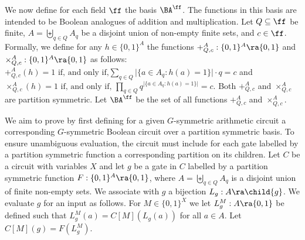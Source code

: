 \documentclass{toc}
\begin{document}
We now define for each field $\ff$ the basis $\BA^{\ff}$. The functions in this
basis are intended to be Boolean analogues of addition and multiplication. Let
$Q \subseteq \ff$ be finite, $A = \biguplus_{q \in Q}A_q$ be a disjoint union of
non-empty finite sets, and $c \in \ff$.  Formally, we define for any $h \in \{0,1\}^{A}$ the functions $+^A_{Q, c}: \{0,
1\}^A \ra \{0, 1\}$ and $\times^A_{Q, c}: \{0, 1\}^A \ra \{0, 1\}$ as follows: $ +^{A}_{Q, c}(h) = 1
\text{ if, and only if,} \sum_{q \in Q} \vert \{a \in A_q : h(a) = 1\} \vert
\cdot q = c $ and $ \times^{A}_{Q, c}(h) = 1 \text{ if, and only if, } \prod_{q
  \in Q} q^{\vert \{a \in A_q : h(a) = 1\} \vert} = c$. Both $+^A_{Q, c}$ and
$\times^A_{Q, c}$ are partition symmetric. Let $\BA^{\ff}$ be the set of all
functions $+^A_{Q, c}$ and $\times^A_{Q, c}$.

We aim to prove  by first defining for a
given $G$-symmetric arithmetic circuit a corresponding $G$-symmetric Boolean
circuit over a partition symmetric basis. To ensure unambiguous evaluation, the
circuit must include for each gate labelled by a partition symmetric function a
corresponding partition on its children. Let $C$ be a circuit with variables $X$
and let $g$ be a gate in $C$ labelled by a partition symmetric function $F :
\{0, 1\}^A \ra \{0, 1\}$, where $A = \biguplus_{q \in Q}A_q$ is a disjoint union
of finite non-empty sets. We associate with $g$ a bijection $L_g : A \ra
\child{g}$. We evaluate $g$ for an input as follows. For $M \in \{0, 1\}^{X}$ we
let $L^M_g : A \ra \{0, 1\}$ be defined such that $L^M_g(a) = C[M](L_g(a))$ for
all $a \in A$. Let $C[M](g) = F(L^M_g)$.
\end{document}
